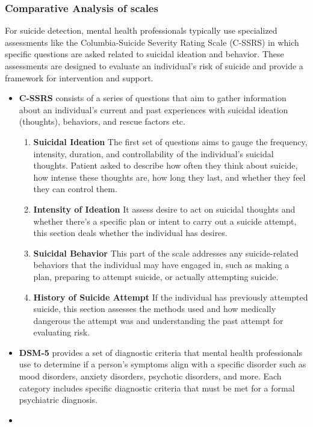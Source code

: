 \documentclass[sn-mathphys,Numbered]{sn-jnl}%
\theoremstyle{thmstyleone}%
\theoremstyle{thmstyletwo}%
\theoremstyle{thmstylethree}%
\begin{document}
\subsubsection{Comparative Analysis of scales}
For suicide detection, mental health professionals typically use specialized assessments like the Columbia-Suicide Severity Rating Scale (C-SSRS) in which specific questions are asked related to suicidal ideation and behavior. These assessments are designed to evaluate an individual's risk of suicide and provide a framework for intervention and support.
\begin{itemize}
\item
\textbf{C-SSRS} consists of a series of questions that aim to gather information about an individual's current and past experiences with suicidal ideation (thoughts), behaviors, and rescue factors etc.
\begin{enumerate}[label=(\roman*)]
\item  
\textbf{Suicidal Ideation}
The first set of questions aims to gauge the frequency, intensity, duration, and controllability of the individual's suicidal thoughts. Patient asked to describe how often they think about suicide, how intense these thoughts are, how long they last, and whether they feel they can control them.
\item
\textbf{Intensity of Ideation}
It assess desire to act on suicidal thoughts and whether there's a specific plan or intent to carry out a suicide attempt, this section deals whether the individual has desires. 
\item
\textbf{Suicidal Behavior}
This part of the scale addresses any suicide-related behaviors that the individual may have engaged in, such as making a plan, preparing to attempt suicide, or actually attempting suicide.
\item 
\textbf{History of Suicide Attempt}
If the individual has previously attempted suicide, this section assesses the methods used and how medically dangerous the attempt was and understanding the past attempt for evaluating risk.
\end{enumerate}  
\item 
\textbf{DSM-5} \cite{havigerova2019text} provides a set of diagnostic criteria that mental health professionals use to determine if a person's symptoms align with a specific disorder such as mood disorders, anxiety disorders, psychotic disorders, and more. Each category includes specific diagnostic criteria that must be met for a formal psychiatric diagnosis.
\item 

\end{itemize}
\end{document}
